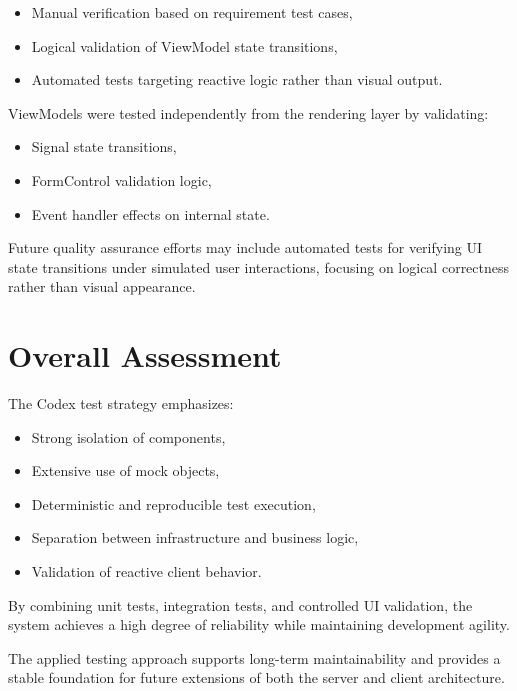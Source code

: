 \begin{itemize}
    \item Manual verification based on requirement test cases,
    \item Logical validation of ViewModel state transitions,
    \item Automated tests targeting reactive logic rather than visual output.
\end{itemize}

ViewModels were tested independently from the rendering layer by validating:

\begin{itemize}
    \item Signal state transitions,
    \item FormControl validation logic,
    \item Event handler effects on internal state.
\end{itemize}

Future quality assurance efforts may include automated tests for verifying UI state transitions under simulated user interactions, focusing on logical correctness rather than visual appearance.

\section{Overall Assessment}

The Codex test strategy emphasizes:

\begin{itemize}
    \item Strong isolation of components,
    \item Extensive use of mock objects,
    \item Deterministic and reproducible test execution,
    \item Separation between infrastructure and business logic,
    \item Validation of reactive client behavior.
\end{itemize}

By combining unit tests, integration tests, and controlled UI validation, the system achieves a high degree of reliability while maintaining development agility.

The applied testing approach supports long-term maintainability and provides a stable foundation for future extensions of both the server and client architecture.
